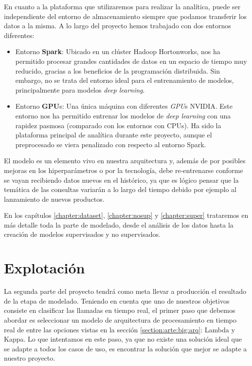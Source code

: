En cuanto a la plataforma que utilizaremos para realizar la analítica, puede ser independiente del entorno de almacenamiento siempre que podamos transferir los datos a la misma. A lo largo del proyecto hemos trabajado con dos entornos diferentes: 

\begin{itemize}
\item Entorno \textbf{Spark}: Ubicado en un clúster Hadoop Hortonworks, nos ha permitido procesar grandes cantidades de datos en un espacio de tiempo muy reducido, gracias a los beneficios de la programación distribuida. Sin embargo, no se trata del entorno ideal para el entrenamiento de modelos, principalmente para modelos  \textit{deep learning}.

\item Entorno \textbf{GPU}s: Una única máquina con diferentes \textit{GPU}s NVIDIA. Este entorno nos ha permitido entrenar los modelos de \textit{deep learning} con una rapidez pasmosa (comparado con los entornos con CPUs). Ha sido la plataforma principal de analítica durante este proyecto, aunque el preprocesado se viera penalizado con respecto al entorno Spark.


\end{itemize}
 

El modelo es un elemento vivo en nuestra arquitectura y, además de por posibles mejoras en los hiperparámetros o por la tecnología, debe re-entrenarse conforme se vayan recibiendo datos nuevos en el histórico, ya que es lógico pensar que la temática de las consultas variarán a lo largo del tiempo debido por ejemplo al lanzamiento de nuevos productos. 


En los capítulos \ref{chapter:dataset}, \ref{chapter:nosup} y \ref{chapter:super} trataremos en más detalle toda la parte de modelado, desde el análisis de los datos hasta la creación de modelos supervisados y no supervisados.

\section{Explotación}
\label{section:arq:exp}
La segunda parte del proyecto tendrá como meta llevar a producción el resultado de la etapa de modelado. Teniendo en cuenta que uno de nuestros objetivos consiste en clasificar las llamadas en tiempo real,
el primer paso que debemos abordar es seleccionar un modelo de arquitectura de procesamiento en tiempo real de entre las opciones vistas en la sección \ref{section:arte:big:arq}: Lambda y Kappa. Lo que intentamos en este paso, ya que no existe una solución ideal que se adapte a todos los casos de uso, es encontrar la solución que mejor se adapte a nuestro proyecto.


